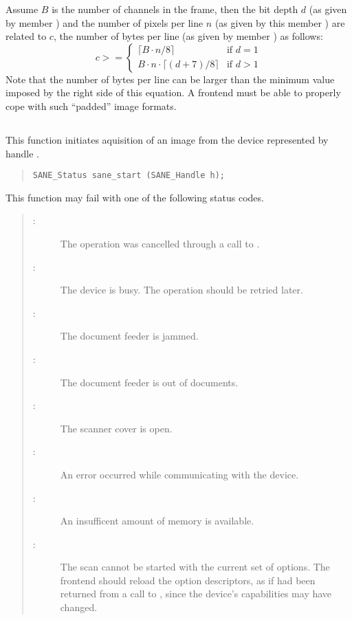 \documentclass[11pt,DVIps]{report}
\begin{document}
Assume $B$ is the number of channels in the frame, then the bit depth
$d$ (as given by member ) and the number of pixels per
line $n$ (as given by this member ) are
related to $c$, the number of bytes per line (as given by member
) as follows:
\[
  c >= \left\{
  \begin{array}{ll}
    \lceil B\cdot n / 8\rceil & \mbox{if $d=1$}\\
    B\cdot n \cdot \lceil (d + 7)/8 \rceil & \mbox{if $d>1$}
  \end{array}
  \right.
\]
Note that the number of bytes per line can be larger than the minimum
value imposed by the right side of this equation.  A frontend must be
able to properly cope with such ``padded'' image formats.


\subsection{}

This function initiates aquisition of an image from the device
represented by handle .
\begin{quote}
\begin{verbatim}
SANE_Status sane_start (SANE_Handle h);
\end{verbatim}
\end{quote}
This function may fail with one of the following status codes.
\begin{quote}
\begin{description}
\item[:] The operation was cancelled through
  a call to .
\item[:] The device is busy. The
  operation should be retried later.
\item[:] The document feeder is jammed.
\item[:] The document feeder is out of
  documents.
\item[:] The scanner cover is open.
\item[:] An error occurred while communicating
  with the device.
\item[:] An insufficent amount of memory
  is available.
\item[:] The scan cannot be started with the current
  set of options. The frontend should reload the option descriptors, as if
   had been returned from a call to
  , since the device's capabilities may have
  changed.
\end{description}
\end{quote}
\end{document}
